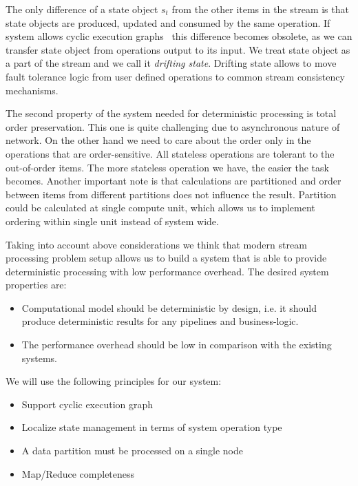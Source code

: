 The only difference of a state object $s_t$ from the other items in the stream is that state objects are produced, updated and consumed by the same operation. If system allows cyclic execution graphs~\cite{Murray:2013:NTD:2517349.2522738} this difference becomes obsolete, as we can transfer state object from operations output to its input. We treat state object as a part of the stream and we call it {\it drifting state}. Drifting state allows to move fault tolerance logic from user defined operations to common stream consistency mechanisms.

The second property of the system needed for deterministic processing is total order preservation. This one is quite challenging due to asynchronous nature of network. On the other hand we need to care about the order only in the operations that are order-sensitive. All stateless operations are tolerant to the out-of-order items. The more stateless operation we have, the easier the task becomes. Another important note is that calculations are partitioned and order between items from different partitions does not influence the result. Partition could be calculated at single compute unit, which allows us to implement ordering within single unit instead of system wide.

Taking into account above considerations we think that modern stream processing problem setup allows us to build a system that is able to provide deterministic processing with low performance overhead. The desired system properties are:
\begin{itemize}
    \item Computational model should be deterministic by design, i.e. it should produce deterministic results for any pipelines and business-logic.
    \item The performance overhead should be low in comparison with the existing systems.
\end{itemize}
We will use the following principles for our system:
\begin{itemize}
    \item Support cyclic execution graph
    \item Localize state management in terms of system operation type
    \item A data partition must be processed on a single node
    \item Map/Reduce completeness
\end{itemize}
